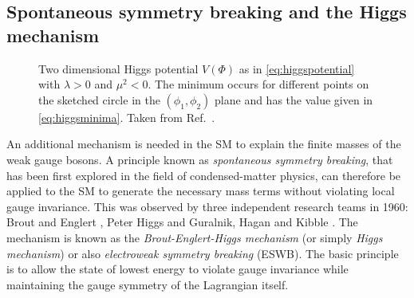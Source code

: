 \subsection{Spontaneous symmetry breaking and the Higgs mechanism}
\label{sec:ewsymbreaking}






\begin{figure}
  \caption[Two dimensional Higgs potential $V(\Phi)$ with $\lambda > 0$ and $\mu^2 < 0$.]{Two dimensional Higgs potential $V(\Phi)$ as in \cref{eq:higgspotential} with $\lambda > 0$ and $\mu^2 < 0$. The minimum occurs for different points on the sketched circle in the $(\phi_1, \phi_2)$ plane and has the value given in \cref{eq:higgsminima}. Taken from Ref.~\cite{Halzen:1984mc}.
  }
  \label{fig:higgspotential}
\end{figure}

An additional mechanism is needed in the SM to explain the finite masses of the weak gauge bosons. 
A principle known as \emph{spontaneous symmetry breaking}, that has been first explored in the field of condensed-matter physics,  can therefore be applied to the SM to generate the necessary mass terms without violating local gauge invariance.
This was observed by three independent research teams in 1960: Brout and Englert \cite{PhysRevLett.13.321}, Peter Higgs \cite{PhysRevLett.13.508,HIGGS1964132} and Guralnik, Hagan and Kibble \cite{PhysRevLett.13.585}.
The mechanism is known as the \emph{Brout-Englert-Higgs mechanism} (or simply \emph{Higgs mechanism}) or also \emph{electroweak symmetry breaking} (ESWB).
The basic principle is to allow the state of lowest energy to violate gauge invariance while maintaining the gauge symmetry of the Lagrangian itself.

